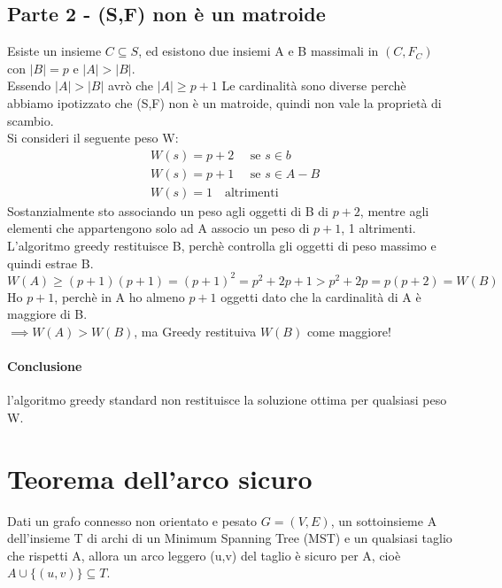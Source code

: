 \subsection{Parte 2 - (S,F) non è un matroide}
Esiste un insieme $C \subseteq S$, ed esistono due insiemi A e B massimali in $(C, F_C)$ con $|B|=p$ e $|A| > |B|$.\\
Essendo $|A| > |B|$ avrò che $|A| \geq p+1$ 
Le cardinalità sono diverse perchè abbiamo ipotizzato che (S,F) non è un matroide, quindi non vale la proprietà di scambio.\\
Si consideri il seguente peso W:
\begin{align*}
    &W(s) = p+2 \quad \text{ se } s \in b\\
    &W(s) = p+1 \quad \text{ se } s \in A-B\\
    &W(s) = 1 \quad \text{altrimenti}
\end{align*}
Sostanzialmente sto associando un peso agli oggetti di B di $p+2$, mentre agli elementi che appartengono solo ad A associo
un peso di $p+1$, 1 altrimenti.\\
L'algoritmo greedy restituisce B, perchè controlla gli oggetti di peso massimo e quindi estrae B.\\
$W(A) \geq (p+1)(p+1) = (p+1)^2 = p^2 + 2p + 1 > p^2 + 2p = p(p+2) = W(B)$\\
Ho $p+1$, perchè in A ho almeno $p+1$ oggetti dato che la cardinalità di A è maggiore di B.\\
$\implies W(A) > W(B)$, ma Greedy restituiva $W(B)$ come maggiore!\\
\paragraph*{Conclusione} l'algoritmo greedy standard non restituisce la soluzione ottima per
qualsiasi peso W.
\section{Teorema dell'arco sicuro}
Dati un grafo connesso non orientato e pesato $G=(V,E)$, un sottoinsieme A dell'insieme T di archi di un
Minimum Spanning Tree (MST) e un qualsiasi taglio che rispetti A, allora un arco leggero (u,v) del taglio è
sicuro per A, cioè $A \cup \{(u,v)\} \subseteq T$.
